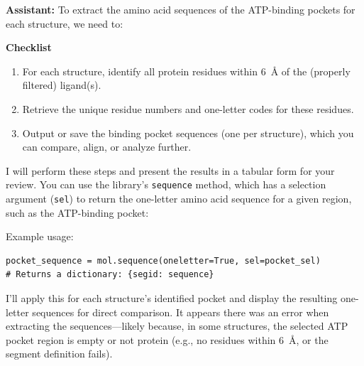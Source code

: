 \documentclass{article}
\begin{document}
\begin{assistantbox}
\textbf{Assistant:} To extract the amino acid sequences of the ATP-binding pockets for each structure, we need to:

\textbf{Checklist}
\begin{enumerate}[label=\arabic*.]
    \item For each structure, identify all protein residues within 6~\AA{} of the (properly filtered) ligand(s).
    \item Retrieve the unique residue numbers and one-letter codes for these residues.
    \item Output or save the binding pocket sequences (one per structure), which you can compare, align, or analyze further.
\end{enumerate}

I will perform these steps and present the results in a tabular form for your review. You can use the library's \texttt{sequence} method, which has a selection argument (\texttt{sel}) to return the one-letter amino acid sequence for a given region, such as the ATP-binding pocket:

Example usage:
\begin{verbatim}
pocket_sequence = mol.sequence(oneletter=True, sel=pocket_sel)
# Returns a dictionary: {segid: sequence}
\end{verbatim}

I'll apply this for each structure's identified pocket and display the resulting one-letter sequences for direct comparison. It appears there was an error when extracting the sequences—likely because, in some structures, the selected ATP pocket region is empty or not protein (e.g., no residues within 6~\AA{}, or the segment definition fails).


\end{assistantbox}
\end{document}
